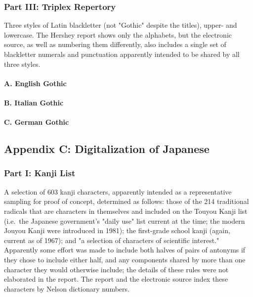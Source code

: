 \documentclass{article}
\begin{document}
\subsubsection*{Part III: Triplex Repertory}

Three styles of Latin blackletter (not "Gothic" despite the titles), upper-
and lowercase.  The Hershey report shows only the alphabets, but the
electronic source, as well as numbering them differently, also
includes a single set of blackletter numerals and punctuation
apparently intended to be shared by all three styles.

\paragraph*{A. English Gothic}

\paragraph*{B. Italian Gothic}

\paragraph*{C. German Gothic}

\subsection*{Appendix C: Digitalization of Japanese}

\subsubsection*{Part I: Kanji List}

A selection of 603 kanji characters, apparently intended as a representative
sampling for proof of concept, determined as follows: those of the 214
traditional radicals that are characters in themselves and included on the
Touyou Kanji list (i.e.\ the Japanese government's "daily use" list current
at the time; the modern Jouyou Kanji were introduced in 1981); the
first-grade school kanji (again, current as of 1967); and "a selection of
characters of scientific interest." Apparently some effort was made to
include both halves of pairs of antonyms if they chose to include either
half, and any components shared by more than one character they would
otherwise include; the details of these rules were not elaborated in the
report.  The report and the electronic source index these characters by
Nelson dictionary numbers.
\end{document}
